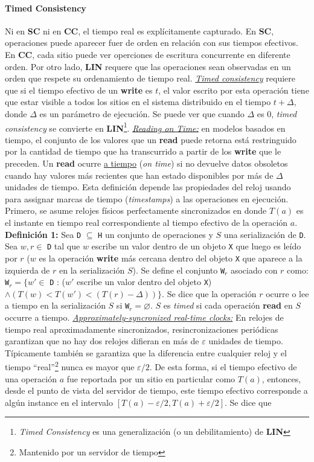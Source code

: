 \paragraph{\textnormal{\textbf{Timed Consistency}}}
Ni en \textbf{SC} ni en \textbf{CC}, el tiempo real es explícitamente capturado. En \textbf{SC}, operaciones puede aparecer fuer de orden en relación con sus tiempos efectivos. En \textbf{CC}, cada sitio puede ver operciones de escritura concurrente en diferente orden. Por otro lado, \textbf{LIN} requere que las operaciones sean observadas en un orden que respete su ordenamiento de tiempo real. \underline{\emph{Timed consistency}} requiere que si el tiempo efectivo de un \textbf{write} es $t$, el valor escrito por esta operación tiene que estar visible a todos los sitios en el sistema distribuido en el tiempo $t + \Delta$, donde $\Delta$ es un parámetro de ejecución. Se puede ver que cuando $\Delta$ es 0, \emph{timed consistency} se convierte en \textbf{LIN}\footnote{\emph{Timed Consistency} es una generalización (o un debilitamiento) de \textbf{LIN}}. \underline{\emph{Reading on Time:}} en modelos basados en tiempo, el conjunto de los valores que un \textbf{read} puede retorna está restringuido por la cantidad de tiempo que ha transcurrido a partir de los \textbf{write} que le preceden. Un \textbf{read} ocurre \underline{a tiempo} (\emph{on time}) si no devuelve datos obsoletos cuando hay valores más recientes que han estado disponibles por más de $\Delta$ unidades de tiempo. Esta definición depende las propiedades del reloj usando para assignar marcas de tiempo (\emph{timestamps}) a las operaciones en ejecución. Primero, se asume relojes físicos perfectamente sincronizados en donde $T(a)$ es el instante en tiempo real correspondiente al tiempo efectivo de la operación $a$. \textbf{Definición 1:} Sea \texttt{D} $\subseteq$ \texttt{H} un conjunto de operaciones y $S$ una serialización de \texttt{D}. Sea $w, r \in $ \texttt{D} tal que $w$ escribe un valor dentro de un objeto \texttt{X} que luego es leído por $r$ ($w$ es la operación \textbf{write} más cercana dentro del objeto \texttt{X} que aparece a la izquierda de $r$ en la serialización $S$). Se define el conjunto \texttt{W}$_r$ asociado con $r$ como: \texttt{W}$_r = \{w' \in$ \texttt{D} : ($w'$ escribe un valor dentro del objeto \texttt{X}) $\wedge (T(w) < T(w') < (T(r) - \Delta))\}$. Se dice que la operación $r$ ocurre o lee a tiempo en la serialización $S$ si \texttt{W}$_r = \varnothing$. $S$ es \emph{timed} si cada operación \textbf{read} en $S$ occurre a tiempo. \underline{\emph{Approximately-syncronized real-time clocks:}} En relojes de tiempo real aproximadamente sincronizados, resincronizaciones periódicas garantizan que no hay dos relojes difieran en más de $\varepsilon$ unidades de tiempo. Típicamente también se garantiza que la diferencia entre cualquier reloj y el tiempo ``real''\footnote{Mantenido por un servidor de tiempo} nunca es mayor que $\varepsilon/2$. De esta forma, si el tiempo efectivo de una operación $a$ fue reportada por un sitio en particular como $T(a)$, entonces, desde el punto de vista del servidor de tiempo, este tiempo efectivo corresponde a algún instance en el intervalo $[T(a) - \varepsilon/2, T(a) + \varepsilon/2]$. Se dice que 